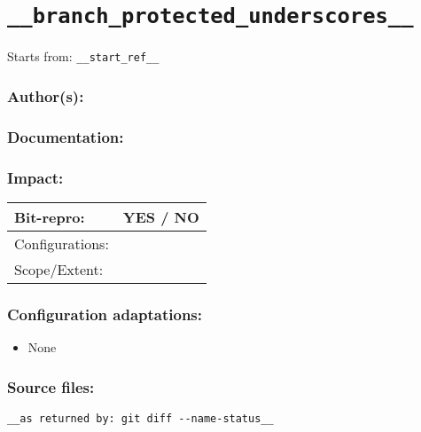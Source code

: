\newpage
\section{\texttt{__branch_protected_underscores__}}
\label{branch:__branch__}
Starts from: \texttt{__start_ref__}

\subsubsection*{Author(s):}


\subsubsection*{Documentation:}


\subsubsection*{Impact:}
\begin{tabular}{|l|p{12cm}|}
 \hline
 Bit-repro: & YES / NO\\ \hline
 Configurations: & \\ \hline
 Scope/Extent: & \\
 \hline
\end{tabular}

\subsubsection*{Configuration adaptations:}
\begin{itemize}
 \item None 
\end{itemize}

\subsubsection*{Source files:}
\begin{lstlisting}
__as returned by: git diff --name-status__
\end{lstlisting}
